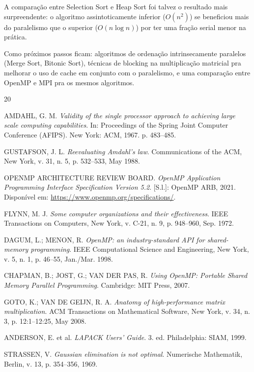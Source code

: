 \documentclass[12pt]{article}
\begin{document}
A comparação entre Selection Sort e Heap Sort foi talvez o resultado mais surpreendente: o algoritmo assintoticamente inferior ($O(n^2)$) se beneficiou mais do paralelismo que o superior ($O(n \log n)$) por ter uma fração serial menor na prática.

Como próximos passos ficam: algoritmos de ordenação intrinsecamente paralelos (Merge Sort, Bitonic Sort), técnicas de blocking na multiplicação matricial pra melhorar o uso de cache em conjunto com o paralelismo, e uma comparação entre OpenMP e MPI pra os mesmos algoritmos.


\begin{thebibliography}{20}

AMDAHL, G. M.
\textit{Validity of the single processor approach to achieving large scale computing capabilities}.
In: Proceedings of the Spring Joint Computer Conference (AFIPS). New York: ACM, 1967. p. 483--485.

GUSTAFSON, J. L.
\textit{Reevaluating Amdahl's law}.
Communications of the ACM, New York, v. 31, n. 5, p. 532--533, May 1988.

OPENMP ARCHITECTURE REVIEW BOARD.
\textit{OpenMP Application Programming Interface Specification Version 5.2}.
[S.l.]: OpenMP ARB, 2021. Disponível em: \url{https://www.openmp.org/specifications/}.

FLYNN, M. J.
\textit{Some computer organizations and their effectiveness}.
IEEE Transactions on Computers, New York, v. C-21, n. 9, p. 948--960, Sep. 1972.

DAGUM, L.; MENON, R.
\textit{OpenMP: an industry-standard API for shared-memory programming}.
IEEE Computational Science and Engineering, New York, v. 5, n. 1, p. 46--55, Jan./Mar. 1998.

CHAPMAN, B.; JOST, G.; VAN DER PAS, R.
\textit{Using OpenMP: Portable Shared Memory Parallel Programming}.
Cambridge: MIT Press, 2007.

GOTO, K.; VAN DE GEIJN, R. A.
\textit{Anatomy of high-performance matrix multiplication}.
ACM Transactions on Mathematical Software, New York, v. 34, n. 3, p. 12:1--12:25, May 2008.

ANDERSON, E. et al.
\textit{LAPACK Users' Guide}. 3. ed. Philadelphia: SIAM, 1999.

STRASSEN, V.
\textit{Gaussian elimination is not optimal}.
Numerische Mathematik, Berlin, v. 13, p. 354--356, 1969.


\end{thebibliography}
\end{document}
